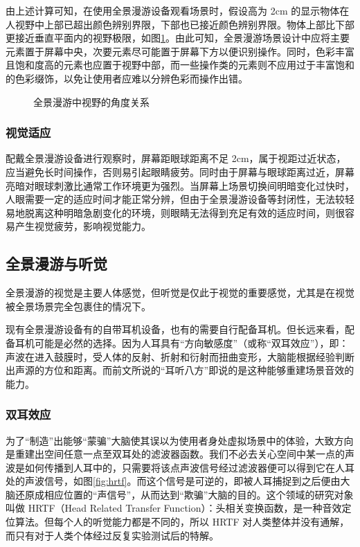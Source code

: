 由上述计算可知，在使用全景漫游设备观看场景时，假设高为 2cm 的显示物体在人视野中上部已超出颜色辨别界限，下部也已接近颜色辨别界限。物体上部比下部更接近垂直平面内的视野极限，如图\ref{fig:angle}。由此可知，全景漫游场景设计中应将主要元素置于屏幕中央，次要元素尽可能置于屏幕下方以便识别操作。同时，色彩丰富且饱和度高的元素也应置于视野中部，而一些操作类的元素则不应用过于丰富饱和的色彩缀饰，以免让使用者应难以分辨色彩而操作出错。

\begin{figure}[htp]
\centering
{}
\caption{全景漫游中视野的角度关系}
\label{fig:angle}
\end{figure}

\subsubsection{视觉适应}

配戴全景漫游设备进行观察时，屏幕距眼球距离不足 2cm，属于视距过近状态，应当避免长时间操作，否则易引起眼睛疲劳。同时由于屏幕与眼球距离过近，屏幕亮暗对眼球刺激比通常工作环境更为强烈。当屏幕上场景切换间明暗变化过快时，人眼需要一定的适应时间才能正常分辨，但由于全景漫游设备等封闭性，无法较轻易地脱离这种明暗急剧变化的环境，则眼睛无法得到充足有效的适应时间，则很容易产生视觉疲劳，影响视觉能力。

\subsection{全景漫游与听觉}

全景漫游的视觉是主要人体感觉，但听觉是仅此于视觉的重要感觉，尤其是在视觉被全景场景完全包裹住的情况下。

现有全景漫游设备有的自带耳机设备，也有的需要自行配备耳机。但长远来看，配备耳机可能是必然的选择。因为人耳具有“方向敏感度”（或称“双耳效应”），即：声波在进入鼓膜时，受人体的反射、折射和衍射而扭曲变形，大脑能根据经验判断出声源的方位和距离。而前文所说的“耳听八方”即说的是这种能够重建场景音效的能力。

\subsubsection{双耳效应}
为了“制造”出能够“蒙骗”大脑使其误以为使用者身处虚拟场景中的体验，大致方向是重建出空间任意一点至双耳处的滤波器函数。我们不必去关心空间中某一点的声波是如何传播到人耳中的，只需要将该点声波信号经过滤波器便可以得到它在人耳处的声波信号，如图\ref{fig:hrtf}。而这个信号是可逆的，即被人耳捕捉到之后便由大脑还原成相应位置的“声信号”，从而达到“欺骗”大脑的目的。这个领域的研究对象叫做 HRTF（Head Related Transfer Function）：头相关变换函数，是一种音效定位算法。但每个人的听觉能力都是不同的，所以 HRTF 对人类整体并没有通解，而只有对于人类个体经过反复实验测试后的特解。

